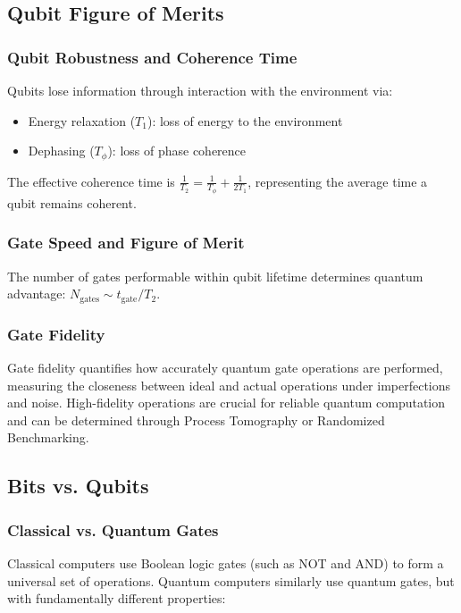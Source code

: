 \documentclass{article}
\begin{document}
\subsection{Qubit Figure of Merits}

\subsubsection*{Qubit Robustness and Coherence Time}
Qubits lose information through interaction with the environment via:
\begin{itemize}
    \item Energy relaxation ($T_1$): loss of energy to the environment
    \item Dephasing ($T_\phi$): loss of phase coherence
\end{itemize}

The effective coherence time is $\frac{1}{T_2} = \frac{1}{T_\phi} + \frac{1}{2T_1}$, representing the average time a qubit remains coherent.

\subsubsection*{Gate Speed and Figure of Merit}
The number of gates performable within qubit lifetime determines quantum advantage: $N_{\text{gates}} \sim t_{\text{gate}}/T_2$.

\subsubsection*{Gate Fidelity}
Gate fidelity quantifies how accurately quantum gate operations are performed, measuring the closeness between ideal and actual operations under imperfections and noise. High-fidelity operations are crucial for reliable quantum computation and can be determined through Process Tomography or Randomized Benchmarking.

\subsection{Bits vs. Qubits}
\subsubsection*{Classical vs. Quantum Gates}

Classical computers use Boolean logic gates (such as NOT and AND) to form a universal set of operations. Quantum computers similarly use quantum gates, but with fundamentally different properties:
\end{document}
